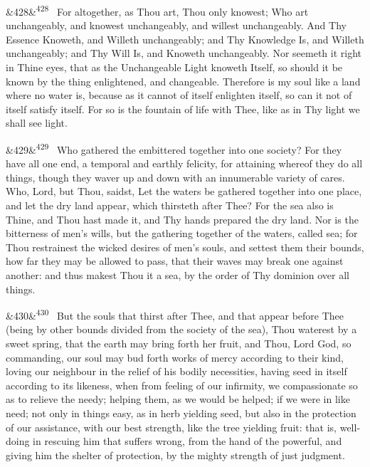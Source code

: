 \documentclass[12pt]{article}
\newcommand{\para}[1][]{\par\noindent\ifx&#1&\else\textsuperscript{\footnotesize #1}~\fi}
\begin{document}
\para[428] For altogether, as Thou art, Thou only knowest; Who art unchangeably, and knowest unchangeably, and willest unchangeably. And Thy Essence Knoweth, and Willeth unchangeably; and Thy Knowledge Is, and Willeth unchangeably; and Thy Will Is, and Knoweth unchangeably. Nor seemeth it right in Thine eyes, that as the Unchangeable Light knoweth Itself, so should it be known by the thing enlightened, and changeable. Therefore is my soul like a land where no water is, because as it cannot of itself enlighten itself, so can it not of itself satisfy itself. For so is the fountain of life with Thee, like as in Thy light we shall see light.

\para[429] Who gathered the embittered together into one society? For they have all one end, a temporal and earthly felicity, for attaining whereof they do all things, though they waver up and down with an innumerable variety of cares. Who, Lord, but Thou, saidst, Let the waters be gathered together into one place, and let the dry land appear, which thirsteth after Thee? For the sea also is Thine, and Thou hast made it, and Thy hands prepared the dry land. Nor is the bitterness of men's wills, but the gathering together of the waters, called sea; for Thou restrainest the wicked desires of men's souls, and settest them their bounds, how far they may be allowed to pass, that their waves may break one against another: and thus makest Thou it a sea, by the order of Thy dominion over all things.

\para[430] But the souls that thirst after Thee, and that appear before Thee (being by other bounds divided from the society of the sea), Thou waterest by a sweet spring, that the earth may bring forth her fruit, and Thou, Lord God, so commanding, our soul may bud forth works of mercy according to their kind, loving our neighbour in the relief of his bodily necessities, having seed in itself according to its likeness, when from feeling of our infirmity, we compassionate so as to relieve the needy; helping them, as we would be helped; if we were in like need; not only in things easy, as in herb yielding seed, but also in the protection of our assistance, with our best strength, like the tree yielding fruit: that is, well-doing in rescuing him that suffers wrong, from the hand of the powerful, and giving him the shelter of protection, by the mighty strength of just judgment.
\end{document}
